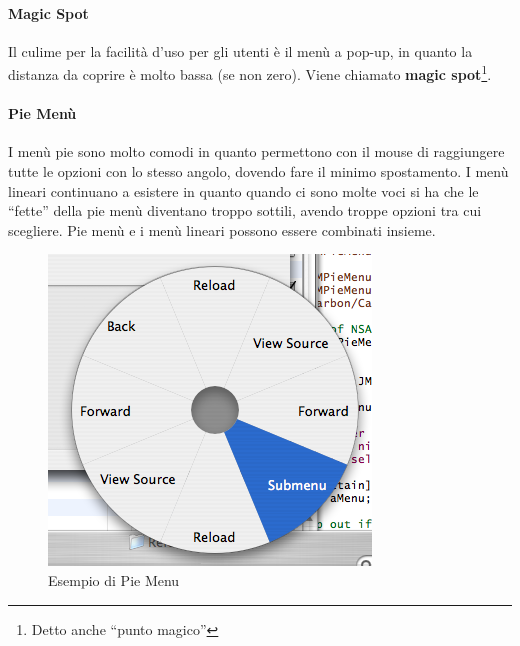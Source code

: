 \paragraph*{Magic Spot}Il culime per la facilit\`a d'uso per gli utenti \`e il men\`u a pop-up, in quanto la distanza da coprire \`e molto bassa (se non zero). Viene chiamato \textbf{magic spot}\footnote{Detto anche ``punto magico''}.
\paragraph*{Pie Men\`u}I men\`u pie sono molto comodi in quanto permettono con il mouse di raggiungere tutte le opzioni con lo stesso angolo, dovendo fare il minimo spostamento. I men\`u lineari continuano a esistere in quanto quando ci  sono molte voci si ha che le ``fette'' della pie men\`u diventano troppo sottili, avendo troppe opzioni tra cui scegliere.
Pie men\`u e i men\`u lineari possono essere combinati insieme.

\begin{figure}[h]
  \centering
  \includegraphics[scale=0.5]{30-10-15-01}
  \caption{Esempio di Pie Menu}
\end{figure}
